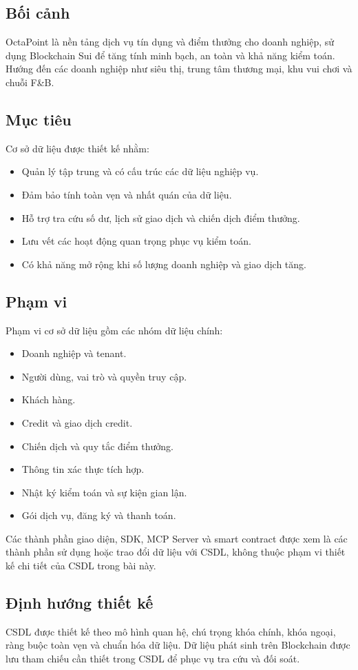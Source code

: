 \subsection{Bối cảnh}

OctaPoint là nền tảng dịch vụ tín dụng và điểm thưởng cho doanh nghiệp, sử dụng Blockchain Sui để tăng tính minh bạch, an toàn và khả năng kiểm toán. Hướng đến các doanh nghiệp như siêu thị, trung tâm thương mại, khu vui chơi và chuỗi F\&B.

\subsection{Mục tiêu}

Cơ sở dữ liệu được thiết kế nhằm:

\begin{itemize}
    \item Quản lý tập trung và có cấu trúc các dữ liệu nghiệp vụ.
    \item Đảm bảo tính toàn vẹn và nhất quán của dữ liệu.
    \item Hỗ trợ tra cứu số dư, lịch sử giao dịch và chiến dịch điểm thưởng.
    \item Lưu vết các hoạt động quan trọng phục vụ kiểm toán.
    \item Có khả năng mở rộng khi số lượng doanh nghiệp và giao dịch tăng.
\end{itemize}

\subsection{Phạm vi}

Phạm vi cơ sở dữ liệu gồm các nhóm dữ liệu chính:

\begin{itemize}
    \item Doanh nghiệp và tenant.
    \item Người dùng, vai trò và quyền truy cập.
    \item Khách hàng.
    \item Credit và giao dịch credit.
    \item Chiến dịch và quy tắc điểm thưởng.
    \item Thông tin xác thực tích hợp.
    \item Nhật ký kiểm toán và sự kiện gian lận.
    \item Gói dịch vụ, đăng ký và thanh toán.
\end{itemize}

Các thành phần giao diện, SDK, MCP Server và smart contract được xem là các thành phần sử dụng hoặc trao đổi dữ liệu với CSDL, không thuộc phạm vi thiết kế chi tiết của CSDL trong bài này.

\subsection{Định hướng thiết kế}

CSDL được thiết kế theo mô hình quan hệ, chú trọng khóa chính, khóa ngoại, ràng buộc toàn vẹn và chuẩn hóa dữ liệu. Dữ liệu phát sinh trên Blockchain được lưu tham chiếu cần thiết trong CSDL để phục vụ tra cứu và đối soát.
